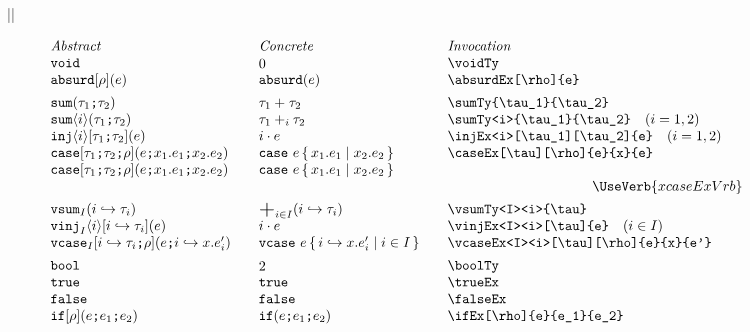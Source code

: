 \documentclass[11pt]{article}
\begin{document}
\begin{figure}
  ||
  \begin{small}
    \begin{displaymath}
      \begin{array}{l@{\qquad}l@{\qquad}l@{\qquad}l}
        \textit{Abstract} & \textit{Concrete} & \textit{Invocation} \\
        \voidTy                           & \voidTy*                & \verb|\voidTy|                                    \\
        \absurdEx[\rho]{e}                & \absurdEx*{e}           & \verb|\absurdEx[\rho]{e}|                         \\[1ex]

        \sumTy{\tau_1}{\tau_2}            & \sumTy*{\tau_1}{\tau_2} & \verb|\sumTy{\tau_1}{\tau_2}|                     \\
        \sumTy<i>{\tau_1}{\tau_2}         & \sumTy*<i>{\tau_1}{\tau_2} & \verb|\sumTy<i>{\tau_1}{\tau_2}| \quad (i=1,2) \\
        \injEx<i>[\tau_1][\tau_2]{e}      & \injEx*<i>{e}           & \verb|\injEx<i>[\tau_1][\tau_2]{e}| \quad (i=1,2) \\
        \caseEx[\tau][\rho]{e}{x}{e}     & \caseEx*{e}{x}{e}        & \verb|\caseEx[\tau][\rho]{e}{x}{e}|              \\
        \xcaseEx[\tau_1][\tau_2][\rho]{e}{x_1}{e_1}{x_2}{e_2} & \xcaseEx*{e}{x_1}{e_1}{x_2}{e_2} & \\
        \multicolumn{3}{r}{\UseVerb{xcaseExVrb}} \\[1ex]


        \vsumTy<I><i>{\tau}               & \vsumTy*<I><i>{\tau}    & \verb|\vsumTy<I><i>{\tau}|                        \\
        \vinjEx<I><i>[\tau]{e}            & \vinjEx*<I><i>{e}       & \verb|\vinjEx<I><i>[\tau]{e}| \quad (i\in I)      \\
        \vcaseEx<I><i>[\tau][\rho]{e}{x}{e'} & \vcaseEx*<I><i>{e}{x}{e'}  & \verb|\vcaseEx<I><i>[\tau][\rho]{e}{x}{e'}| \\[1ex]

        \boolTy                           & \boolTy*                & \verb|\boolTy|                                    \\
        \trueEx                           & \trueEx*                & \verb|\trueEx|                                    \\
        \falseEx                          & \falseEx*               & \verb|\falseEx|                                   \\
        \ifEx[\rho]{e}{e_1}{e_2}          & \ifEx*{e}{e_1}{e_2}     & \verb|\ifEx[\rho]{e}{e_1}{e_2}|                   \\[1ex]


\end{array}
\end{displaymath}
\end{small}
\end{figure}
\end{document}
